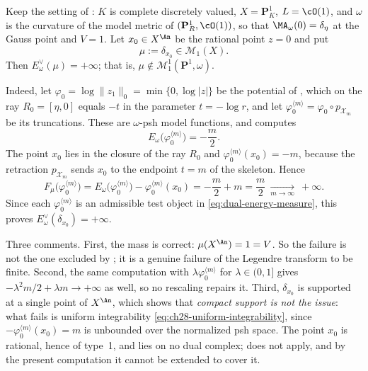 \begin{example}
\label{ex:ch28-infinite-dual-energy}
Keep the setting of : $K$ is complete
discretely valued, $X=\mathbf P^1_K$, $L=\cO(1)$, and $\omega$ is the
curvature of the model metric of $(\mathbf P^1_R,\cO(1))$, so that
$\MA_\omega(0)=\delta_\eta$ at the Gauss point and $V=1$.  Let
$x_0\in X^{\An}$ be the rational point $z=0$ and put
\[
 \mu:=\delta_{x_0}\in\mathcal M_1(X).
\]
Then $E^\vee_\omega(\mu)=+\infty$; that is,
$\mu\notin\mathcal M^1_1(\mathbf P^1,\omega)$.

Indeed, let $\varphi_0=\log\lVert z_1\rVert_0=\min\{0,\log|z|\}$ be the
potential of , which on the ray
$R_0=[\eta,0]$ equals $-t$ in the parameter $t=-\log r$, and let
$\varphi_0^{\langle m\rangle}=\varphi_0\circ p_{\mathcal X_m}$ be its
truncations.  These are $\omega$-psh model functions, and
 computes
\[
 E_\omega\bigl(\varphi_0^{\langle m\rangle}\bigr)=-\frac m2 .
\]
The point $x_0$ lies in the closure of the ray $R_0$ and
$\varphi_0^{\langle m\rangle}(x_0)=-m$, because the retraction
$p_{\mathcal X_m}$ sends $x_0$ to the endpoint $t=m$ of the skeleton.
Hence
\[
 F_\mu\bigl(\varphi_0^{\langle m\rangle}\bigr)
 =E_\omega\bigl(\varphi_0^{\langle m\rangle}\bigr)
  -\varphi_0^{\langle m\rangle}(x_0)
 =-\frac m2+m=\frac m2
 \ \xrightarrow[m\to\infty]{}\ +\infty .
\]
Since each $\varphi_0^{\langle m\rangle}$ is an admissible test object in
\eqref{eq:dual-energy-measure}, this proves
$E^\vee_\omega(\delta_{x_0})=+\infty$.

Three comments.  First, the mass is correct: $\mu(X^{\An})=1=V$.  So the
failure is not the one excluded by ; it is a
genuine failure of the Legendre transform to be finite.  Second, the same
computation with $\lambda\varphi_0^{\langle m\rangle}$ for
$\lambda\in(0,1]$ gives $-\lambda^2m/2+\lambda m\to+\infty$ as well, so
no rescaling repairs it.  Third, $\delta_{x_0}$ is supported at a single
point of $X^{\An}$, which shows that \emph{compact support is not the
issue}: what fails is uniform integrability
\eqref{eq:ch28-uniform-integrability}, since
$-\varphi_0^{\langle m\rangle}(x_0)=m$ is unbounded over the normalized
psh space.  The point $x_0$ is rational, hence of type~1, and lies on no
dual complex;  does not apply, and by the
present computation it cannot be extended to cover it.
\end{example}

